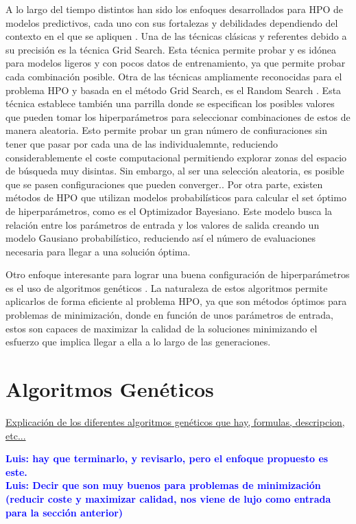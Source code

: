 \documentclass{uathesis-es}
\begin{document}
A lo largo del tiempo distintos han sido los enfoques desarrollados para HPO de modelos predictivos, cada uno con sus fortalezas y debilidades dependiendo del contexto en el que se apliquen \cite{bischl2023hyperparameter}. Una de las técnicas clásicas y referentes debido a su precisión es la técnica Grid Search. Esta técnica permite probar y es idónea para modelos ligeros y con pocos datos de entrenamiento, ya que permite probar cada combinación posible. Otra de las técnicas ampliamente reconocidas para el problema HPO y basada en el método Grid Search, es el Random Search \cite{bergstra2012random}. Esta técnica establece también una parrilla donde se especifican los posibles valores que pueden tomar los hiperparámetros para seleccionar combinaciones de estos de manera aleatoria. Esto permite probar un gran número de confiuraciones sin tener que pasar por cada una de las individualemnte, reduciendo considerablemente el coste computacional permitiendo explorar zonas del espacio de búsqueda muy disintas. Sin embargo, al ser una selección aleatoria, es posible que se pasen configuraciones que pueden converger.. Por otra parte, existen métodos de HPO que utilizan modelos probabilísticos para calcular el set óptimo de hiperparámetros, como es el Optimizador Bayesiano. Este modelo busca la relación entre los parámetros de entrada y los valores de salida creando un modelo Gausiano probabilístico, reduciendo así el número de evaluaciones necesaria para llegar a una solución óptima.

Otro enfoque interesante para lograr una buena configuración de hiperparámetros es el uso de algoritmos genéticos \cite{alibrahim2021hyperparameter}. La naturaleza de estos algoritmos permite aplicarlos de forma eficiente al problema HPO, ya que son métodos óptimos para problemas de minimización, donde en función de unos parámetros de entrada, estos son capaces de maximizar la calidad de la soluciones minimizando el esfuerzo que implica llegar a ella a lo largo de las generaciones.

\section{Algoritmos Genéticos}
\underline{Explicación de los diferentes algoritmos genéticos que hay, formulas, descripcion, etc...}

\textcolor{blue}{\textbf{Luis: hay que terminarlo, y revisarlo, pero el enfoque propuesto es este.}}\\

\textcolor{blue}{\textbf{Luis: Decir que son muy buenos para problemas de minimización (reducir coste y maximizar calidad, nos viene de lujo como entrada para la sección anterior)}}\\
\end{document}
